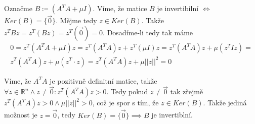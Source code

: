 \documentclass[12pt, a4paper]{article}
\begin{document}
\section{}
\subsection{}
Označme $B \coloneqq (A^T A+ \mu I)$. Víme, že matice $B$ je invertibilní $\iff$ $Ker(B)=\{\vec{0}\}$. Mějme tedy $z \in Ker(B)$. Takže $z^T B z = z^T(Bz)= z^T(\vec{0})=0$. Dosadíme-li tedy tak máme
\begin{gather*}
0=z^T(A^T A+ \mu I)z=z^T(A^T A)z + z^T(\mu I)z = z^T(A^T A)z + \mu (z^T I z) =\\
z^T(A^T A)z + \mu (z^T \cdot z)=z^T(A^T A)z + \mu||z||^2=0
\end{gather*}

Víme, že $A^T A$ je pozitivně definitní matice, takže $\forall z \in \mathbb{R}^n \land z \neq \vec{0}: z^T(A^T A)z > 0$. Tedy pokud $z \neq \vec{0}$ tak zřejmě $z^T(A^T A)z >0 \land  \mu||z||^2 > 0$, což je spor s tím, že $z \in Ker(B)$. Takže jediná možnost je $z=\vec{0}$, tedy $Ker(B)=\{\vec{0}\} \implies B$ je invertiblní.
\end{document}

